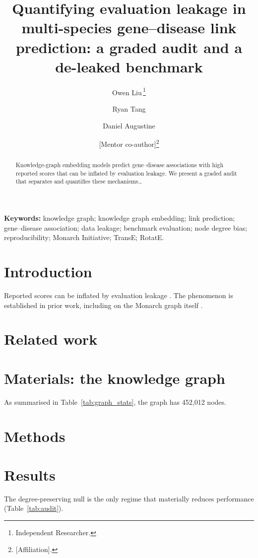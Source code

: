 \documentclass[11pt]{article}
\title{Quantifying evaluation leakage in multi-species gene--disease link
prediction: a graded audit and a de-leaked benchmark}
\author{%
  Owen Liu\,\orcidlink{0009-0003-0476-5270}\thanks{Independent Researcher.} \and
  Ryan Tang\footnotemark[1] \and
  Daniel Augustine\footnotemark[1] \and
  [Mentor co-author]\thanks{[Affiliation].}
}
\date{}
\begin{document}
\maketitle

\begin{abstract}
Knowledge-graph embedding models predict gene--disease associations with high
reported scores that can be inflated by evaluation leakage. We present a graded
audit that separates and quantifies these mechanisms\ldots
\end{abstract}

\noindent\textbf{Keywords:} knowledge graph; knowledge graph embedding; link
prediction; gene--disease association; data leakage; benchmark evaluation; node
degree bias; reproducibility; Monarch Initiative; TransE; RotatE.

\section{Introduction}
Reported scores can be inflated by evaluation leakage
\citep{kapoor2023leakage, bernett2024guiding}. The phenomenon is established in
prior work, including on the Monarch graph itself
\citep{yilmaz2025bias, bradshaw2024effects, briere2025benchmarking}.

\section{Related work}

\section{Materials: the knowledge graph}
As summarised in Table~\ref{tab:graph_stats}, the graph has 452{,}012 nodes.

\section{Methods}

\section{Results}
The degree-preserving null is the only regime that materially reduces
performance (Table~\ref{tab:audit}).
\end{document}
